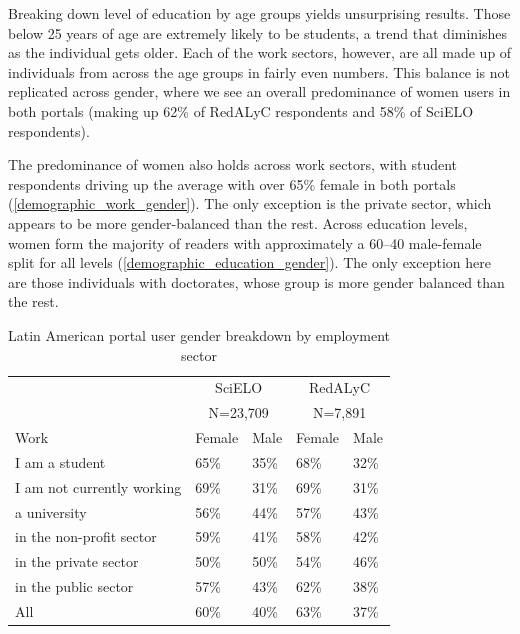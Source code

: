 Breaking down level of education by age groups yields unsurprising results. Those below 25 years of age are extremely likely to be students, a trend that diminishes as the individual gets older. Each of the work sectors, however, are all made up of individuals from across the age groups in fairly even numbers. This balance is not replicated across gender, where we see an overall predominance of women users in both portals (making up 62\% of RedALyC respondents and 58\% of SciELO respondents).

The predominance of women also holds across work sectors, with student respondents driving up the average with over 65\% female in both portals (\autoref{demographic_work_gender}). The only exception is the private sector, which appears to be more gender-balanced than the rest. Across education levels, women form the majority of readers with approximately a 60--40 male-female split for all levels (\autoref{demographic_education_gender}). The only exception here are those individuals with doctorates, whose group is more gender balanced than the rest.



\begin{table}[htbp]
  \centering
  \caption{Latin American portal user gender breakdown by employment sector} \label{demographic_work_gender}
  \label{demographic_work_gender}
    \begin{tabular}{@{}lllll@{}}
    \toprule
          & \multicolumn{2}{c}{SciELO} & \multicolumn{2}{c}{RedALyC} \\
          & \multicolumn{2}{c}{N=23,709} & \multicolumn{2}{c}{N=7,891} \\ \cmidrule{2-5}
    Work  & \multicolumn{1}{c}{Female} & \multicolumn{1}{c}{Male} & \multicolumn{1}{c}{Female} & \multicolumn{1}{c}{Male} \\ \midrule
    I am a student & 65\%  & 35\%  & 68\%  & 32\% \\
    I am not currently working & 69\%  & 31\%  & 69\%  & 31\% \\
    a university & 56\%  & 44\%  & 57\%  & 43\% \\
    in the non-profit sector & 59\%  & 41\%  & 58\%  & 42\% \\
    in the private sector & 50\%  & 50\%  & 54\%  & 46\% \\
    in the public sector & 57\%  & 43\%  & 62\%  & 38\% \\ \midrule
    All   & 60\%  & 40\%  & 63\%  & 37\% \\
    \bottomrule
    \end{tabular}
\end{table}

